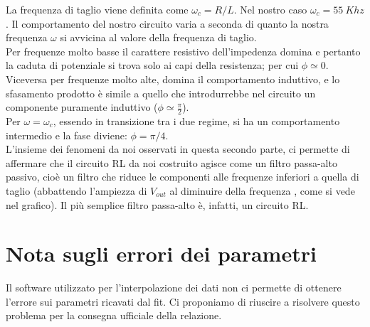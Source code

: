 La frequenza di taglio viene definita come $\omega_c = R/L$. Nel nostro caso $\omega_c = 55\ Khz$. Il comportamento del nostro circuito varia a seconda di quanto la nostra frequenza $\omega$ si avvicina al valore della frequenza di taglio. \\
Per frequenze molto basse il carattere resistivo dell'impedenza domina e pertanto la caduta di potenziale si trova solo ai capi della resistenza; per cui $ \phi \simeq 0$. Viceversa per frequenze molto alte, domina il comportamento induttivo, e lo sfasamento prodotto è simile a quello che introdurrebbe nel circuito un componente puramente induttivo ($\phi \simeq \frac{\pi}{2}$).  \\
Per $\omega = \omega_c$, essendo in transizione tra i due regime, si ha un comportamento intermedio e la fase diviene: $ \phi = \pi/4$. \\

L'insieme dei fenomeni da noi osservati in questa secondo parte, ci permette di affermare che il circuito RL da noi costruito agisce come un filtro passa-alto passivo, cioè un filtro che riduce le componenti alle frequenze inferiori a quella di taglio (abbattendo l'ampiezza di $V_{out}$ al diminuire della frequenza , come si vede nel grafico). Il più semplice filtro passa-alto è, infatti, un circuito RL. 


\section{Nota sugli errori dei parametri}
Il software utilizzato per l'interpolazione dei dati non ci permette di ottenere l'errore sui parametri ricavati dal fit. Ci proponiamo di riuscire a risolvere questo problema per la consegna ufficiale della relazione.
